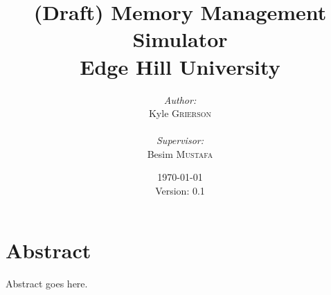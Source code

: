 \documentclass[11pt, twoside]{report}
\title{
	{(Draft) Memory Management Simulator}\\
	{\large Edge Hill University}
}
\author{
	\begin{minipage}{0.4\textwidth}
		\begin{flushleft} \large
			\emph{Author:}\\
			Kyle \textsc{Grierson}\\
		\end{flushleft}	
	\end{minipage}
	\begin{minipage}{0.4\textwidth}
		\begin{flushright} \large
			\emph{Supervisor:} \\
			Besim \textsc{Mustafa}
		\end{flushright}
	\end{minipage}
}
\date{\today\\Version: 0.1}
\begin{document}
\maketitle

\chapter*{Abstract}
Abstract goes here.

\tableofcontents




\end{document}
